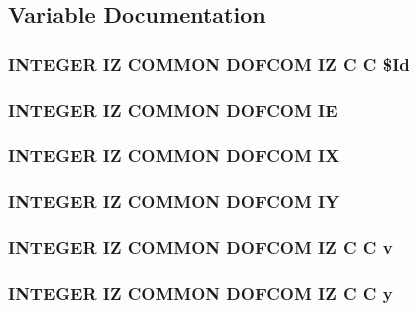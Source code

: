 \subsection{Variable Documentation}
\hypertarget{dofs_8com_aa02048c13266f7effa78ea4854f3c21e}{
\subsubsection[{\$\-Id}]{\setlength{\rightskip}{0pt plus 5cm}I\-N\-T\-E\-G\-E\-R {\bf I\-Z} C\-O\-M\-M\-O\-N D\-O\-F\-C\-O\-M {\bf I\-Z} C C \$Id}}\label{dofs_8com_aa02048c13266f7effa78ea4854f3c21e}
\hypertarget{dofs_8com_a83e3373b6b436b5aab6a707f7bd65f5c}{
\subsubsection[{I\-E}]{\setlength{\rightskip}{0pt plus 5cm}I\-N\-T\-E\-G\-E\-R {\bf I\-Z} C\-O\-M\-M\-O\-N D\-O\-F\-C\-O\-M I\-E}}\label{dofs_8com_a83e3373b6b436b5aab6a707f7bd65f5c}
\hypertarget{dofs_8com_a07baeb789ede205a8430f46c775fea5b}{
\subsubsection[{I\-X}]{\setlength{\rightskip}{0pt plus 5cm}I\-N\-T\-E\-G\-E\-R {\bf I\-Z} C\-O\-M\-M\-O\-N D\-O\-F\-C\-O\-M I\-X}}\label{dofs_8com_a07baeb789ede205a8430f46c775fea5b}
\hypertarget{dofs_8com_a012fb5e16ba5455759666dfd6bc75de3}{
\subsubsection[{I\-Y}]{\setlength{\rightskip}{0pt plus 5cm}I\-N\-T\-E\-G\-E\-R {\bf I\-Z} C\-O\-M\-M\-O\-N D\-O\-F\-C\-O\-M I\-Y}}\label{dofs_8com_a012fb5e16ba5455759666dfd6bc75de3}
\hypertarget{dofs_8com_ae5a4dac0b159f949f20d92c086d6b337}{
\subsubsection[{v}]{\setlength{\rightskip}{0pt plus 5cm}I\-N\-T\-E\-G\-E\-R {\bf I\-Z} C\-O\-M\-M\-O\-N D\-O\-F\-C\-O\-M {\bf I\-Z} C C v}}\label{dofs_8com_ae5a4dac0b159f949f20d92c086d6b337}
\hypertarget{dofs_8com_a2dae3d2dd6f91457cfd868914f158f8b}{
\subsubsection[{y}]{\setlength{\rightskip}{0pt plus 5cm}I\-N\-T\-E\-G\-E\-R {\bf I\-Z} C\-O\-M\-M\-O\-N D\-O\-F\-C\-O\-M {\bf I\-Z} C C y}}\label{dofs_8com_a2dae3d2dd6f91457cfd868914f158f8b}
